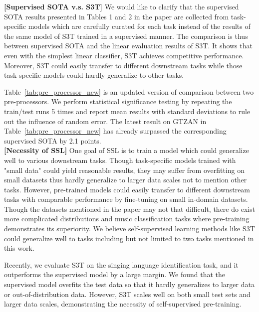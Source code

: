 \documentclass{article}
\begin{document}
\noindent\textbf{[Supervised SOTA v.s. S3T]} We would like to clarify that the supervised SOTA results presented in Tables 1 and 2 in the paper are collected from task-specific models which are carefully curated for each task instead of the results of the same model of S3T trained in a supervised manner. The comparison is thus between supervised SOTA and the linear evaluation results of S3T. It shows that even with the simplest linear classifier, S3T achieves competitive performance. Moreover, S3T could easily transfer to different downstream tasks while those task-specific models could hardly generalize to other tasks. 

Table~\ref{tab:pre_processor_new} is an updated version of comparison between two pre-processors. We perform statistical significance testing by repeating the train/test runs 5 times and report mean results with standard deviations to rule out the influence of random error. The latest result on GTZAN in Table~\ref{tab:pre_processor_new} has already surpassed the corresponding supervised SOTA by 2.1 points.
\\

\noindent\textbf{[Necessity of SSL]} One goal of SSL is to train a model which could generalize well to various downstream tasks. Though task-specific models trained with "small data" could yield reasonable results, they may suffer from overfitting on small datasets thus hardly generalize to larger data scales not to mention other tasks. However, pre-trained models could easily transfer to different downstream tasks with comparable performance by fine-tuning on small in-domain datasets. Though the datasets mentioned in the paper may not that difficult, there do exist more complicated distributions and music classification tasks where pre-training demonstrates its superiority. We believe self-supervised learning methods like S3T could generalize well to tasks including but not limited to two tasks mentioned in this work. 

Recently, we evaluate S3T on the singing language identification task, and it outperforms the supervised model by a large margin. We found that the supervised model overfits the test data so that it hardly generalizes to larger data or out-of-distribution data. However, S3T scales well on both small test sets and larger data scales, demonstrating the necessity of self-supervised pre-training. 
\\
\end{document}
